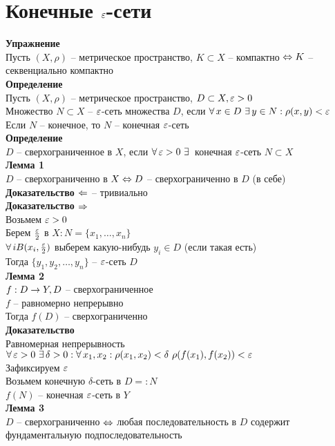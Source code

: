 \documentclass[12pt]{article}
\begin{document}
\section{Конечные $\varepsilon$-сети}
\textbf{Упражнение}\\
Пусть $(X, \rho)$ -- метрическое пространство, $K \subset X$ -- компактно $\Leftrightarrow K$ -- секвенциально компактно\\
\textbf{Определение}\\
Пусть $(X, \rho)$ -- метрическое пространство, $D \subset X, \varepsilon > 0$\\
Множество $N \subset X$ -- $\varepsilon$-сеть множества $D$, если $\forall\, x \in D \ \exists\, y \in N: \rho(x, y) < \varepsilon$\\
Если $N$ -- конечное, то $N$ -- конечная $\varepsilon$-сеть\\
\textbf{Определение}\\
$D$ -- сверхограниченное в  $X$, если $\forall\, \varepsilon > 0 \ \exists\,$ конечная $\varepsilon$-сеть $N \subset X$\\
\textbf{Лемма 1}\\
$D$ -- сверхограниченно в $X \Leftrightarrow D$ -- сверхограниченно в $D$ (в себе)\\
\textbf{Доказательство $\Leftarrow$} -- тривиально\\
\textbf{Доказательство $\Rightarrow$}\\
Возьмем $\varepsilon > 0$\\
Берем $\frac{\varepsilon}2$ в $X: N = \{ x_1, \ldots, x_n\}$\\
$\forall\, i B(x_i, \frac{\varepsilon}2)$ выберем какую-нибудь $y_i \in D$ (если такая есть)\\
Тогда $\{ y_1, y_2, \ldots, y_n\}$ -- $\varepsilon$-сеть $D$\\
\textbf{Лемма 2}\\
$f: D \rightarrow Y, D$ -- сверхограниченное\\
$f$ -- равномерно непрерывно\\
Тогда $f(D)$ -- сверхограниченно\\
\textbf{Доказательство}\\
Равномерная непрерывность $\fall \eps > 0\ \ex \delta > 0: \fall x_1, x_2: \rho(x_1, x_2) < \delta\ \rho(f(x_1), f(x_2)) < \eps$\\
Зафиксируем $\varepsilon$\\
Возьмем конечную $\delta$-сеть в $D =: N$\\
$f(N)$ -- конечная $\varepsilon$-сеть в $Y$\\
\textbf{Лемма 3}\\
$D$ -- сверхограниченно $\Leftrightarrow$ любая последовательность в $D$ содержит фундаментальную подпоследовательность\\
\end{document}
